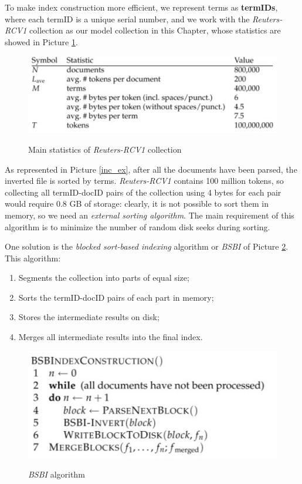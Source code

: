 To make index construction more efficient, we represent terms as \textbf{termIDs}, where each termID is a unique serial number, and we work with the \textit{Reuters-RCV1} collection as our model collection in this Chapter, whose statistics are showed in Picture \ref{reuters}.

\begin{figure}[h!]
		\centering
		\includegraphics[scale = 1.5]{img/reuters.jpg}
		\label{reuters}
        \caption{Main statistics of \textit{Reuters-RCV1} collection}
\end{figure}

As represented in Picture \ref{inc_ex}, after all the documents have been parsed, the inverted file is sorted by terms. \textit{Reuters-RCV1} contains 100 million tokens, so collecting all termID-docID pairs of the collection using 4 bytes for each pair would require 0.8 GB of storage: clearly, it is not possible to sort them in memory, so we need an \textit{external sorting algorithm}. The main requirement of this algorithm is to minimize the number of random disk seeks during sorting. 

One solution is the \textit{blocked sort-based indexing} algorithm or \textit{BSBI} of Picture \ref{bsbi}. This algorithm:

\begin{enumerate}
    \item Segments the collection into parts of equal size;
    \item Sorts the termID-docID pairs of each part in memory;
    \item Stores the intermediate results on disk;
    \item Merges all intermediate results into the final index.
\end{enumerate}

\begin{figure}[h!]
		\centering
		\includegraphics[scale = 1.5]{img/bsbi.jpg}
		\label{bsbi}
        \caption{\textit{BSBI} algorithm}
\end{figure}

